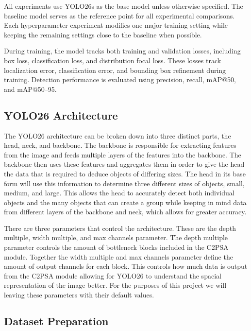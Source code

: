 \documentclass[10pt,twocolumn,letterpaper]{article}
\begin{document}
All experiments use YOLO26s as the base model unless otherwise specified. The baseline model serves as the reference point for all experimental comparisons. Each hyperparameter experiment modifies one major training setting while keeping the remaining settings close to the baseline when possible.

During training, the model tracks both training and validation losses, including box loss, classification loss, and distribution focal loss. These losses track localization error, classification error, and bounding box refinement during training. Detection performance is evaluated using precision, recall, mAP@50, and mAP@50--95.

\subsection{YOLO26 Architecture}

The YOLO26 architecture can be broken down into three distinct parts, the head, neck, and backbone. The backbone is responsible for extracting features from the image and feeds multiple layers of the features into the backbone. The backbone then uses these features and aggregates them in order to give the head the data that is required to deduce objects of differing sizes. The head in its base form will use this information to determine three different sizes of objects, small, medium, and large.  This allows the head to accurately detect both individual objects and the many objects that can create a group while keeping in mind data from different layers of the backbone and neck, which allows for greater accuracy.

There are three parameters that control the architecture.  These are the depth multiple, width multiple, and max channels parameter. The depth multiple parameter controls the amount of bottleneck blocks included in the C2PSA module.  Together the width multiple and max channels parameter define the amount of output channels for each block. This controls how much data is output from the C2PSA module allowing for YOLO26 to understand the spacial representation of the image better. For the purposes of this project we will leaving these parameters with their default values.

\subsection{Dataset Preparation}
\end{document}
